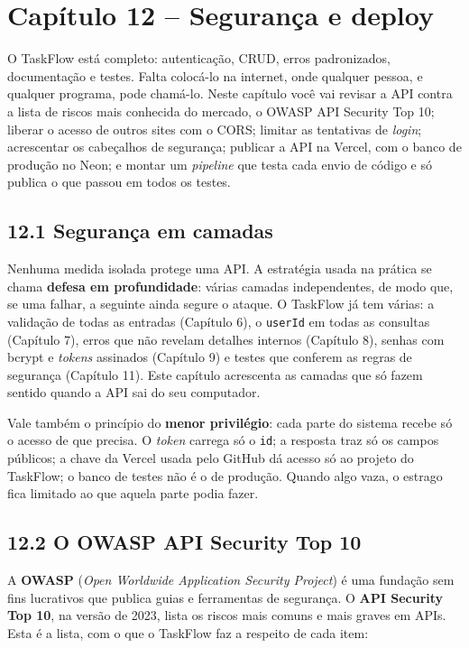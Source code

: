 \section{Capítulo 12 -- Segurança e deploy}

O TaskFlow está completo: autenticação, CRUD, erros padronizados, documentação e testes. Falta colocá-lo na internet, onde qualquer pessoa, e qualquer programa, pode chamá-lo. Neste capítulo você vai revisar a API contra a lista de riscos mais conhecida do mercado, o OWASP API Security Top 10; liberar o acesso de outros sites com o CORS; limitar as tentativas de \textit{login}; acrescentar os cabeçalhos de segurança; publicar a API na Vercel, com o banco de produção no Neon; e montar um \textit{pipeline} que testa cada envio de código e só publica o que passou em todos os testes.

\subsection{12.1 Segurança em camadas}

Nenhuma medida isolada protege uma API. A estratégia usada na prática se chama \textbf{defesa em profundidade}: várias camadas independentes, de modo que, se uma falhar, a seguinte ainda segure o ataque. O TaskFlow já tem várias: a validação de todas as entradas (Capítulo 6), o \texttt{userId} em todas as consultas (Capítulo 7), erros que não revelam detalhes internos (Capítulo 8), senhas com bcrypt e \textit{tokens} assinados (Capítulo 9) e testes que conferem as regras de segurança (Capítulo 11). Este capítulo acrescenta as camadas que só fazem sentido quando a API sai do seu computador.

Vale também o princípio do \textbf{menor privilégio}: cada parte do sistema recebe só o acesso de que precisa. O \textit{token} carrega só o \texttt{id}; a resposta traz só os campos públicos; a chave da Vercel usada pelo GitHub dá acesso só ao projeto do TaskFlow; o banco de testes não é o de produção. Quando algo vaza, o estrago fica limitado ao que aquela parte podia fazer.

\subsection{12.2 O OWASP API Security Top 10}

A \textbf{OWASP} (\textit{Open Worldwide Application Security Project}) é uma fundação sem fins lucrativos que publica guias e ferramentas de segurança. O \textbf{API Security Top 10}, na versão de 2023, lista os riscos mais comuns e mais graves em APIs. Esta é a lista, com o que o TaskFlow faz a respeito de cada item:

